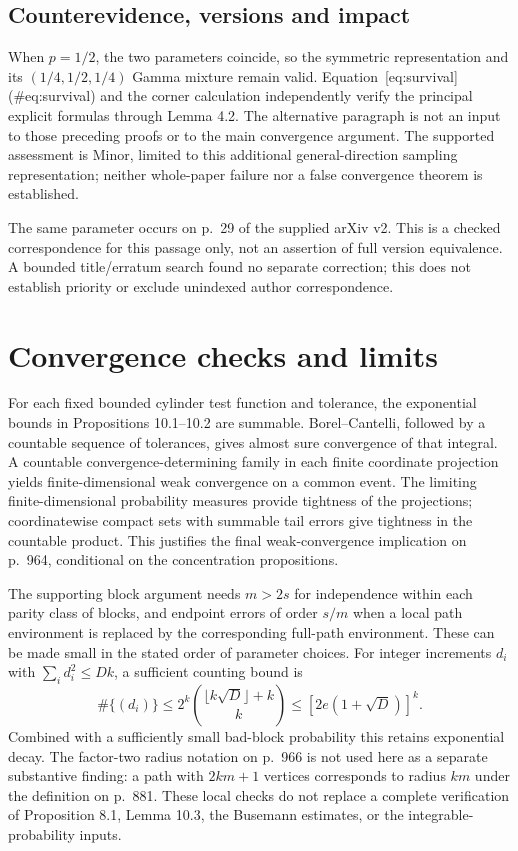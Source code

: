 \documentclass[10pt]{article}
\begin{document}
\subsection*{Counterevidence, versions and impact}
When \(p=1/2\), the two parameters coincide, so the symmetric representation and its \((1/4,1/2,1/4)\) Gamma mixture remain valid. Equation [eq:survival] (\#eq:survival) and the corner calculation independently verify the principal explicit formulas through Lemma 4.2. The alternative paragraph is not an input to those preceding proofs or to the main convergence argument. The supported assessment is Minor, limited to this additional general-direction sampling representation; neither whole-paper failure nor a false convergence theorem is established.\par
The same parameter occurs on p. 29 of the supplied arXiv v2. This is a checked correspondence for this passage only, not an assertion of full version equivalence. A bounded title/erratum search found no separate correction; this does not establish priority or exclude unindexed author correspondence.\par
\section*{Convergence checks and limits}
For each fixed bounded cylinder test function and tolerance, the exponential bounds in Propositions 10.1–10.2 are summable. Borel–Cantelli, followed by a countable sequence of tolerances, gives almost sure convergence of that integral. A countable convergence-determining family in each finite coordinate projection yields finite-dimensional weak convergence on a common event. The limiting finite-dimensional probability measures provide tightness of the projections; coordinatewise compact sets with summable tail errors give tightness in the countable product. This justifies the final weak-convergence implication on p. 964, conditional on the concentration propositions.\par
The supporting block argument needs \(m>2s\) for independence within each parity class of blocks, and endpoint errors of order \(s/m\) when a local path environment is replaced by the corresponding full-path environment. These can be made small in the stated order of parameter choices. For integer increments \(d_i\) with \(\sum_i d_i^2\leq Dk\), a sufficient counting bound is \[\#\{(d_i)\}\leq 2^k
 \binom{\lfloor k\sqrt D\rfloor+k}{k}
 \leq [2e(1+\sqrt D)]^k.\] Combined with a sufficiently small bad-block probability this retains exponential decay. The factor-two radius notation on p. 966 is not used here as a separate substantive finding: a path with \(2km+1\) vertices corresponds to radius \(km\) under the definition on p. 881. These local checks do not replace a complete verification of Proposition 8.1, Lemma 10.3, the Busemann estimates, or the integrable-probability inputs.\par
\end{document}
